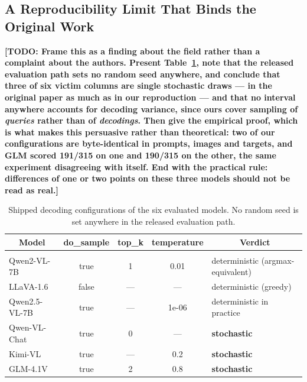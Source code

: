 \documentclass[10pt]{article} %
\newcommand{\todo}[1]{\textbf{[TODO: #1]}}
\begin{document}
\subsection{A Reproducibility Limit That Binds the Original Work}
\label{sec:determinism}

\todo{Frame this as a finding about the field rather than a complaint about the authors. Present Table~\ref{tab:determinism}, note that the released evaluation path sets no random seed anywhere, and conclude that three of six victim columns are single stochastic draws --- in the original paper as much as in our reproduction --- and that no interval anywhere accounts for decoding variance, since ours cover sampling of \emph{queries} rather than of \emph{decodings}. Then give the empirical proof, which is what makes this persuasive rather than theoretical: two of our configurations are byte-identical in prompts, images and targets, and GLM scored 191/315 on one and 190/315 on the other, the same experiment disagreeing with itself. End with the practical rule: differences of one or two points on these three models should not be read as real.}

\begin{table}[t]
\caption{Shipped decoding configurations of the six evaluated models. No random seed is set anywhere
in the released evaluation path.}
\label{tab:determinism}
\begin{center}
\begin{tabular}{lcccl}
\multicolumn{1}{c}{\bf Model} & \multicolumn{1}{c}{\bf do\_sample} & \multicolumn{1}{c}{\bf top\_k} & \multicolumn{1}{c}{\bf temperature} & \multicolumn{1}{c}{\bf Verdict}
\\ \hline \\
Qwen2-VL-7B   & true  & 1   & 0.01   & deterministic (argmax-equivalent) \\
LLaVA-1.6     & false & --- & ---    & deterministic (greedy) \\
Qwen2.5-VL-7B & true  & --- & 1e-06  & deterministic in practice \\
Qwen-VL-Chat  & true  & 0   & ---    & {\bf stochastic} \\
Kimi-VL       & true  & --- & 0.2    & {\bf stochastic} \\
GLM-4.1V      & true  & 2   & 0.8    & {\bf stochastic} \\
\end{tabular}
\end{center}
\end{table}
\end{document}
